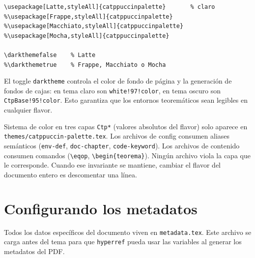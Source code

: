 \begin{lstlisting}[style=latex, frame=none, numbers=none]
\usepackage[Latte,styleAll]{catppuccinpalette}       % claro
%\usepackage[Frappe,styleAll]{catppuccinpalette}
%\usepackage[Macchiato,styleAll]{catppuccinpalette}
%\usepackage[Mocha,styleAll]{catppuccinpalette}

\darkthemefalse    % Latte
%\darkthemetrue    % Frappe, Macchiato o Mocha
\end{lstlisting}

El toggle \texttt{darktheme} controla el color de fondo de página y la
generación de fondos de cajas: en tema claro son \texttt{white!97!color},
en tema oscuro son \texttt{CtpBase!95!color}. Esto garantiza que los
entornos teoremáticos sean legibles en cualquier flavor.

\begin{observacion}{Sistema de color en tres capas}
\texttt{Ctp*} (valores absolutos del flavor) solo aparece en
\texttt{themes/catppuccin-palette.tex}. Los archivos de config consumen
aliases semánticos (\texttt{env-def}, \texttt{doc-chapter},
\texttt{code-keyword}). Los archivos de contenido consumen comandos
(\texttt{\textbackslash eqop}, \texttt{\textbackslash begin\{teorema\}}).
Ningún archivo viola la capa que le corresponde. Cuando ese invariante
se mantiene, cambiar el flavor del documento entero es descomentar
una línea.
\end{observacion}

\section{Configurando los metadatos}
\label{sec:metadatos}

Todos los datos específicos del documento viven en \texttt{metadata.tex}.
Este archivo se carga antes del tema para que \texttt{hyperref} pueda usar
las variables al generar los metadatos del PDF.

